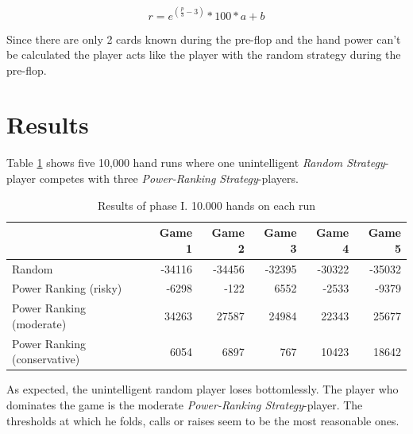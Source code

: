 \begin{equation}
	\label{equ:powerranking}
	r = e^{(\frac{p}{3} - 3)} * 100 * a + b
\end{equation}

Since there are only 2 cards known during the pre-flop and the hand power can't be calculated the player acts like the player with the random strategy during the pre-flop.

\section{Results}
Table \ref{tbl:resultsPhase1} shows five 10,000 hand runs where one unintelligent \emph{Random Strategy}-player competes with three \emph{Power-Ranking Strategy}-players.
\begin{table}[h]
	\centering
	\begin{tabular}[h]{l|r|r|r|r|r}
		& \textbf{Game 1} & \textbf{Game 2} & \textbf{Game 3} & \textbf{Game 4} & \textbf{Game 5}\\
		\hline
		Random & -34116 & -34456 & -32395 & -30322 & -35032\\
		Power Ranking (risky) & -6298 & -122 & 6552 & -2533 & -9379\\
		Power Ranking (moderate) & 34263 & 27587 & 24984 & 22343 & 25677\\
		Power Ranking (conservative) & 6054 & 6897 & 767 & 10423 & 18642\\
	\end{tabular}
	\caption{Results of phase I. 10.000 hands on each run}
	\label{tbl:resultsPhase1}
\end{table}

As expected, the unintelligent random player loses bottomlessly. The player who dominates the game is the moderate \emph{Power-Ranking Strategy}-player. The thresholds at which he folds, calls or raises seem to be the most reasonable ones.

